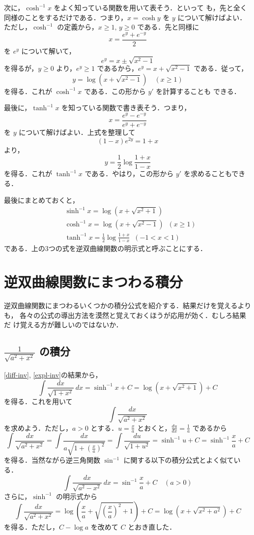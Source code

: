 \documentclass[dvipdfmx,12pt, uplatex]{jsarticle}
\newcommand{\ds}{\displaystyle}
\begin{document}
次に，$\cosh^{-1}x$ をよく知っている関数を用いて表そう．といって
も，先と全く同様のことをするだけである．つまり，$x = \cosh
y$ を $y$ について解けばよい．ただし，$\cosh^{-1}$ の定義から，$ x \geq 1, \, y \geq
0$ である．先と同様に
\[
  x = \frac{e^{y} + e^{-y}}{2}
\]
を $e^y$ について解いて，
\[
  e^y = x \pm \sqrt{x^2-1}
\]
を得るが，$y\geq 0$ より，$e^y \geq 1$ であるから，$e^y = x + \sqrt{x^2-1}$ である．従って，
\[
  y = \log \left( x + \sqrt{x^2-1} \right) \quad \left( x \geq 1 \right)
\]
を得る．これが $\cosh^{-1} x$ である．この形から $y'$ を計算することも
できる．

最後に，$\tanh^{-1}x$ を知っている関数で書き表そう．つまり，
\[
x = \frac{e^{y}-e^{-y}}{e^{y}+e^{-y}}
\]
を $y$ について解けばよい．上式を整理して
\[
(1-x)e^{2y} = 1+x
\]
より，
\[
y = \frac{1}{2} \log \frac{1+x}{1-x}
\]
を得る．これが $\tanh^{-1}x$ である．やはり，この形から $y'$ を求めることもできる．

最後にまとめておくと，
\begin{align*}
&\sinh^{-1} x = \log \left( x+ \sqrt{x^2+1}\right)\\
&\cosh^{-1} x = \log \left( x+ \sqrt{x^2-1}\right) \; \; ( x \geq 1)\\
&\tanh^{-1} x = \frac{1}{2} \log \frac{1+x}{1-x} \; \; (-1 < x < 1)
\end{align*}
である．上の3つの式を逆双曲線関数の明示式と呼ぶことにする．

\section{逆双曲線関数にまつわる積分}

逆双曲線関数にまつわるいくつかの積分公式を紹介する．結果だけを覚えるよりも，
各々の公式の導出方法を漠然と覚えておくほうが応用が効く．むしろ結果だ
け覚える方が難しいのではないか．

\subsection{ $\ds \frac{1}{\sqrt{a^2+x^2}}$ の積分}\label{1a2x2}

\ref{diff-inv}, \ref{expl-inv}の結果から，
\[
 \int \frac{dx}{\sqrt{1+x^2}} \ dx = \sinh^{-1} x+C = \log \left( x+\sqrt{x^2+1}\right)+C
\]
を得る．これを用いて
\[
  \int \frac{dx}{\sqrt{a^2+x^2}} 
\]
を求めよう．ただし，$a>0$ とする．$u=\frac{x}{a}$ とおくと，$\frac{du}{dx}=\frac{1}{a}$ であるから
\[
  \int \frac{dx}{\sqrt{a^2+x^2}} = \int \frac{dx}{a \sqrt{1+\left(\frac{x}{a}\right)^2}}
  = \int \frac{du}{\sqrt{1+u^2}} = \sinh^{-1} u +C = \sinh^{-1} \frac{x}{a} +C
\]
を得る．当然ながら逆三角関数 $\sin^{-1}$ に関する以下の積分公式とよく似ている．
\[
 \int \frac{dx}{\sqrt{a^2-x^2}} \ dx = \sin^{-1}\frac{x}{a} +C \quad (a>0)
\]
さらに，$\sinh^{-1}$ の明示式から
\[
\int \frac{dx}{\sqrt{a^2+x^2}} = \log \left( \frac{x}{a} + \sqrt{\left(\frac{x}{a}\right)^2 +1} \right)+C
= \log \left( x + \sqrt{x^2 + a^2} \right) + C
\]
を得る．ただし，$C-\log a$ を改めて $C$ とおき直した．
\end{document}
